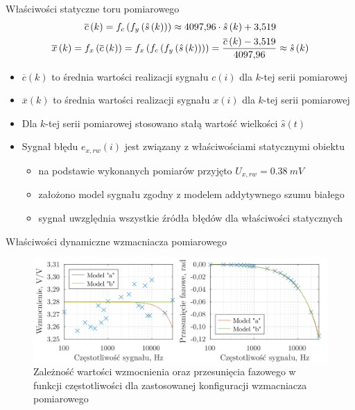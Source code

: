 \documentclass[12pt, polish, aspectratio = 169]{beamer}
\begin{document}
\begin{frame}{Właściwości statyczne toru pomiarowego}
\begin{gather}
\overline{c} \left(k\right) = f_{c} \left(f_{y} \left(\hat{s} \left(k\right)\right)\right) \approx \num{4097.96} \cdot \hat{s} \left(k\right) + \num{3.519} \label{eq:pom_func_static} \\
\overline{x} \left(k\right) = f_{x} \left(\overline{c} \left(k\right)\right) = f_{x} \left(f_{c} \left(f_{y} \left(\hat{s} \left(k\right)\right)\right)\right) = \frac{\overline{c} \left(k\right) - \num{3.519}}{\num{4097.96}} \approx \hat{s} \left(k\right) \label{eq:pom_funx_static}
\end{gather}
\begin{itemize}
\item $\overline{c}(k)$ to średnia wartości realizacji sygnału $c(i)$ dla $k$-tej serii pomiarowej
\item $\overline{x}(k)$ to średnia wartości realizacji sygnału $x(i)$ dla $k$-tej serii pomiarowej
\item Dla $k$-tej serii pomiarowej stosowano stałą wartość wielkości $\hat{s}(t)$
\item Sygnał błędu $e_{x,rw}(i)$ jest związany z właściwościami statycznymi obiektu
	\begin{itemize}
	\item na podstawie wykonanych pomiarów przyjęto $U_{x,rw} = \qty{0.38}{mV}$
	\item założono model sygnału zgodny z modelem addytywnego szumu białego
	\item sygnał uwzględnia wszystkie źródła błędów dla właściwości statycznych
	\end{itemize}
\end{itemize}
\end{frame}

\begin{frame}{Właściwości dynamiczne wzmacniacza pomiarowego}
\begin{figure}
\begin{center}
\includegraphics[scale = 0.75]{obrazki/dynamic_ampout}
\caption{Zależność wartości wzmocnienia oraz przesunięcia fazowego w funkcji częstotliwości dla zastosowanej konfiguracji wzmacniacza pomiarowego}
\label{fig:pom_dynamic_ampout}
\end{center}
\end{figure}
\end{frame}
\end{document}
